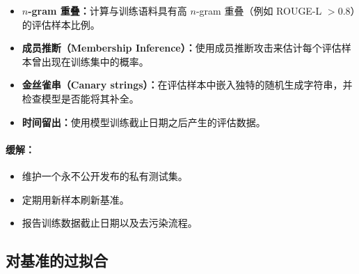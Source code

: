 \begin{itemize}
  \item \textbf{$n$-gram 重叠：}计算与训练语料具有高 $n$-gram 重叠（例如 ROUGE-L $> 0.8$）的评估样本比例。
  \item \textbf{成员推断（Membership Inference）：}使用成员推断攻击来估计每个评估样本曾出现在训练集中的概率。
  \item \textbf{金丝雀串（Canary strings）：}在评估样本中嵌入独特的随机生成字符串，并检查模型是否能将其补全。
  \item \textbf{时间留出：}使用模型训练截止日期之后产生的评估数据。
\end{itemize}

\paragraph{缓解：}
\label{mitigation}

\begin{itemize}
  \item 维护一个永不公开发布的私有测试集。
  \item 定期用新样本刷新基准。
  \item 报告训练数据截止日期以及去污染流程。
\end{itemize}

\subsection{对基准的过拟合}
\label{overfitting-to-benchmarks}

